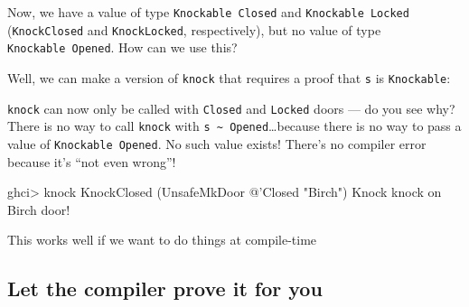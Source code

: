 \documentclass[]{article}
\newenvironment{Shaded}{}{}
\newcommand{\CommentTok}[1]{\textcolor[rgb]{0.38,0.63,0.69}{\textit{#1}}}
\newcommand{\DataTypeTok}[1]{\textcolor[rgb]{0.56,0.13,0.00}{#1}}
\newcommand{\FunctionTok}[1]{\textcolor[rgb]{0.02,0.16,0.49}{#1}}
\newcommand{\NormalTok}[1]{#1}
\newcommand{\OtherTok}[1]{\textcolor[rgb]{0.00,0.44,0.13}{#1}}
\newcommand{\StringTok}[1]{\textcolor[rgb]{0.25,0.44,0.63}{#1}}
\begin{document}
Now, we have a value of type \texttt{Knockable\ \textquotesingle{}Closed} and
\texttt{Knockable\ \textquotesingle{}Locked} (\texttt{KnockClosed} and
\texttt{KnockLocked}, respectively), but no value of type
\texttt{Knockable\ \textquotesingle{}Opened}. How can we use this?

Well, we can make a version of \texttt{knock} that requires a proof that
\texttt{s} is \texttt{Knockable}:

\begin{Shaded}
\end{Shaded}

\texttt{knock} can now only be called with \texttt{Closed} and \texttt{Locked}
doors --- do you see why? There is no way to call \texttt{knock} with
\texttt{s\ \textasciitilde{}\ \textquotesingle{}Opened}\ldots{}because there is
no way to pass a value of \texttt{Knockable\ \textquotesingle{}Opened}. No such
value exists! There's no compiler error because it's ``not even wrong''!

\begin{Shaded}
\begin{Highlighting}[]
\NormalTok{ghci}\FunctionTok{>}\NormalTok{ knock }\DataTypeTok{KnockClosed}\NormalTok{ (}\DataTypeTok{UnsafeMkDoor} \FunctionTok{@}\NormalTok{'}\DataTypeTok{Closed} \StringTok{"Birch"}\NormalTok{)}
\DataTypeTok{Knock}\NormalTok{ knock on }\DataTypeTok{Birch}\NormalTok{ door}\FunctionTok{!}
\end{Highlighting}
\end{Shaded}

This works well if we want to do things at compile-time

\hypertarget{let-the-compiler-prove-it-for-you}{%
\subsection{Let the compiler prove it for
you}\label{let-the-compiler-prove-it-for-you}}
\end{document}
